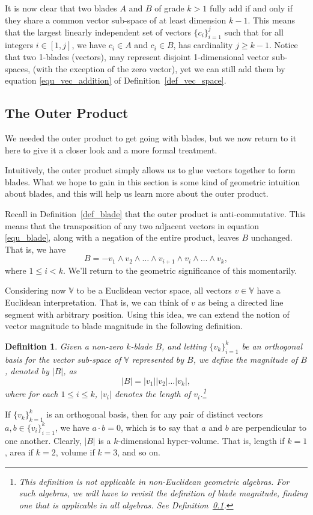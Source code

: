 \documentclass[12pt]{article}
\numberwithin{equation}{section}
\newcommand{\V}{\mathbb{V}}
\newtheorem{definition}{Definition}[section]
\begin{document}
It is now clear that two blades $A$ and $B$ of grade $k>1$ fully add if and only if they
share a common vector sub-space of at least dimension $k-1$.  This means that the largest
linearly independent set of vectors $\{c_i\}_{i=1}^j$ such that for all integers
$i\in[1,j]$, we have $c_i\in A$ and $c_i\in B$, has cardinality $j\geq k-1$.  Notice that
two 1-blades (vectors), may represent disjoint 1-dimensional vector sub-spaces,
(with the exception of the zero vector), yet we can still add them by
equation \eqref{equ_vec_addition} of Definition~\ref{def_vec_space}.

\subsection{The Outer Product}

We needed the outer product to get going with blades, but we now
return to it here to give it a closer look and a more formal treatment.

Intuitively, the outer product simply allows us to glue vectors
together to form blades.  What we hope to gain in this section
is some kind of geometric intuition about blades, and this will
help us learn more about the outer product.

Recall in Definition~\ref{def_blade} that the outer product is anti-commutative.
This means that the transposition of any two adjacent vectors in
equation \eqref{equ_blade}, along with a negation of the
entire product, leaves $B$ unchanged.  That is, we have
\begin{equation}\label{equ_adj_trans}
B = -v_1\wedge v_2\wedge\dots\wedge v_{i+1}\wedge v_i\wedge\dots\wedge v_k,
\end{equation}
where $1\leq i<k$.  We'll return to the geometric significance of this momentarily.

Considering now $\V$ to be a Euclidean vector space, all vectors $v\in\V$ have
a Euclidean interpretation.  That is, we can think of $v$ as being a directed
line segment with arbitrary position.  Using this idea, we can extend the notion
of vector magnitude to blade magnitude in the following definition.
\begin{definition}\label{def_blade_mag}
Given a non-zero $k$-blade $B$, and letting $\{v_k\}_{i=1}^k$ be
an orthogonal basis for the vector sub-space of $\V$ represented
by $B$, we define the magnitude of $B$, denoted by $|B|$, as
\begin{equation}
|B| = |v_1||v_2|\dots |v_k|,
\end{equation}
where for each $1\leq i\leq k$, $|v_i|$ denotes the length of $v_i$.\footnote{This definition is
not applicable in non-Euclidean geometric algebras.  For such algebras, we will have to revisit
the definition of blade magnitude, finding one that is applicable in all algebras.  See Definition~\ref{}.}
\end{definition}
If $\{v_k\}_{k=1}^k$ is an orthogonal basis, then for any pair of distinct vectors $a,b\in\{v_i\}_{i=1}^k$,
we have $a\cdot b=0$, which is to say that $a$ and $b$ are perpendicular to one another.
Clearly, $|B|$ is a $k$-dimensional hyper-volume.  That is, length if $k=1$, area if $k=2$, volume
if $k=3$, and so on.
\end{document}
